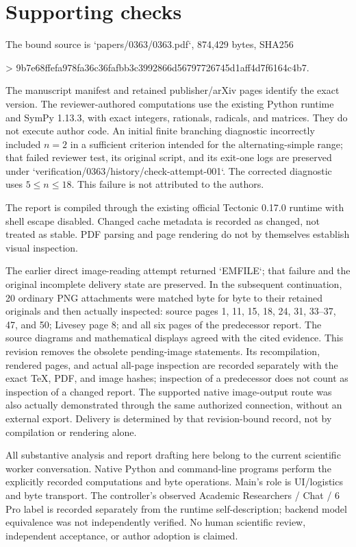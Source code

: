 \documentclass[10pt]{article}
\begin{document}
\section*{Supporting checks}
The bound source is `papers/0363/0363.pdf`, 874,429 bytes, SHA256\par
> 9b7e68ffefa978fa36c36fafbb3c3992866d56797726745d1aff4d7f6164c4b7.\par
The manuscript manifest and retained publisher/arXiv pages identify the exact version. The reviewer-authored computations use the existing Python runtime and SymPy 1.13.3, with exact integers, rationals, radicals, and matrices. They do not execute author code. An initial finite branching diagnostic incorrectly included \(n=2\) in a sufficient criterion intended for the alternating-simple range; that failed reviewer test, its original script, and its exit-one logs are preserved under `verification/0363/history/check-attempt-001`. The corrected diagnostic uses \(5\le n\le18\). This failure is not attributed to the authors.\par
The report is compiled through the existing official Tectonic 0.17.0 runtime with shell escape disabled. Changed cache metadata is recorded as changed, not treated as stable. PDF parsing and page rendering do not by themselves establish visual inspection.\par
The earlier direct image-reading attempt returned `EMFILE`; that failure and the original incomplete delivery state are preserved. In the subsequent continuation, 20 ordinary PNG attachments were matched byte for byte to their retained originals and then actually inspected: source pages 1, 11, 15, 18, 24, 31, 33–37, 47, and 50; Livesey page 8; and all six pages of the predecessor report. The source diagrams and mathematical displays agreed with the cited evidence. This revision removes the obsolete pending-image statements. Its recompilation, rendered pages, and actual all-page inspection are recorded separately with the exact TeX, PDF, and image hashes; inspection of a predecessor does not count as inspection of a changed report. The supported native image-output route was also actually demonstrated through the same authorized connection, without an external export. Delivery is determined by that revision-bound record, not by compilation or rendering alone.\par
All substantive analysis and report drafting here belong to the current scientific worker conversation. Native Python and command-line programs perform the explicitly recorded computations and byte operations. Main’s role is UI/logistics and byte transport. The controller’s observed Academic Researchers / Chat / 6 Pro label is recorded separately from the runtime self-description; backend model equivalence was not independently verified. No human scientific review, independent acceptance, or author adoption is claimed.\par
\end{document}
